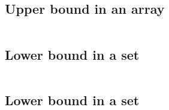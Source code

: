 	\subsection{Upper bound in an array}
        \inputminted{cpp}{BinarySearch/Code/firstValueGEx.cpp}
	
	\subsection{Lower bound in a set}
        \inputminted{cpp}{BinarySearch/Code/firstValueGEx.cpp}

    \subsection{Lower bound in a set}
        \inputminted{cpp}{BinarySearch/Code/firstValueGEx.cpp}